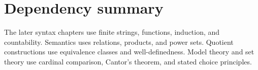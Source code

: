 \section*{Dependency summary}

The later syntax chapters use finite strings, functions, induction, and
countability.  Semantics uses relations, products, and power sets.  Quotient
constructions use equivalence classes and well-definedness.  Model theory and
set theory use cardinal comparison, Cantor's theorem, and stated choice
principles.

